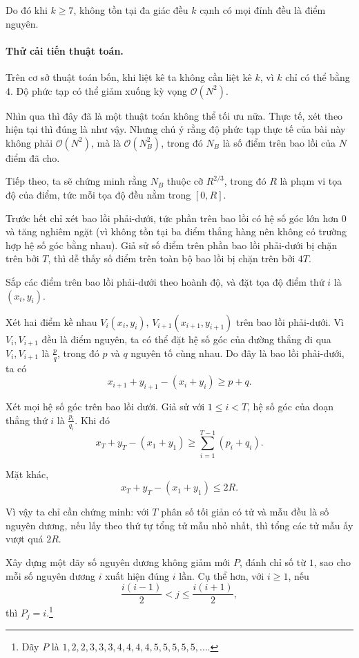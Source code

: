 \documentclass[11pt]{article}
\newcommand{\Oh}{\mathcal{O}}
\begin{document}
Do đó khi \(k\ge 7\), không tồn tại đa giác đều \(k\) cạnh có mọi đỉnh đều là
điểm nguyên.

\paragraph{Thử cải tiến thuật toán.}
Trên cơ sở thuật toán bốn, khi liệt kê ta không cần liệt kê \(k\), vì \(k\) chỉ
có thể bằng \(4\). Độ phức tạp có thể giảm xuống kỳ vọng \(\Oh(N^2)\).

Nhìn qua thì đây đã là một thuật toán không thể tối ưu nữa. Thực tế, xét theo
hiện tại thì đúng là như vậy. Nhưng chú ý rằng độ phức tạp thực tế của bài này
không phải \(\Oh(N^2)\), mà là \(\Oh(N_B^2)\), trong đó \(N_B\) là số điểm trên
bao lồi của \(N\) điểm đã cho.

Tiếp theo, ta sẽ chứng minh rằng \(N_B\) thuộc cỡ \(R^{2/3}\), trong đó \(R\)
là phạm vi tọa độ của điểm, tức mỗi tọa độ đều nằm trong \([0,R]\).

Trước hết chỉ xét bao lồi phải-dưới, tức phần trên bao lồi có hệ số góc lớn
hơn \(0\) và tăng nghiêm ngặt (vì không tồn tại ba điểm thẳng hàng nên không
có trường hợp hệ số góc bằng nhau). Giả sử số điểm trên phần bao lồi phải-dưới
bị chặn trên bởi \(T\), thì dễ thấy số điểm trên toàn bộ bao lồi bị chặn trên
bởi \(4T\).

Sắp các điểm trên bao lồi phải-dưới theo hoành độ, và đặt tọa độ điểm thứ
\(i\) là \((x_i,y_i)\).

Xét hai điểm kề nhau \(V_i(x_i,y_i)\), \(V_{i+1}(x_{i+1},y_{i+1})\) trên bao
lồi phải-dưới. Vì \(V_i,V_{i+1}\) đều là điểm nguyên, ta có thể đặt hệ số góc
của đường thẳng đi qua \(V_i,V_{i+1}\) là \(\frac{p}{q}\), trong đó \(p\) và
\(q\) nguyên tố cùng nhau. Do đây là bao lồi phải-dưới, ta có
\[
  x_{i+1}+y_{i+1}-(x_i+y_i)\ge p+q.
\]

Xét mọi hệ số góc trên bao lồi dưới. Giả sử với \(1\le i<T\), hệ số góc của
đoạn thẳng thứ \(i\) là \(\frac{p_i}{q_i}\). Khi đó
\[
  x_T+y_T-(x_1+y_1)\ge \sum_{i=1}^{T-1}(p_i+q_i).
\]

Mặt khác,
\[
  x_T+y_T-(x_1+y_1)\le 2R.
\]

Vì vậy ta chỉ cần chứng minh: với \(T\) phân số tối giản có tử và mẫu đều là
số nguyên dương, nếu lấy theo thứ tự tổng tử mẫu nhỏ nhất, thì tổng các tử mẫu
ấy vượt quá \(2R\).

Xây dựng một dãy số nguyên dương không giảm mới \(P\), đánh chỉ số từ \(1\), sao
cho mỗi số nguyên dương \(i\) xuất hiện đúng \(i\) lần. Cụ thể hơn, với
\(i\ge 1\), nếu
\[
  \frac{i(i-1)}{2}<j\le \frac{i(i+1)}{2},
\]
thì \(P_j=i\).\footnote{Dãy \(P\) là
\(1,2,2,3,3,3,4,4,4,4,5,5,5,5,5,\ldots\).}
\end{document}
